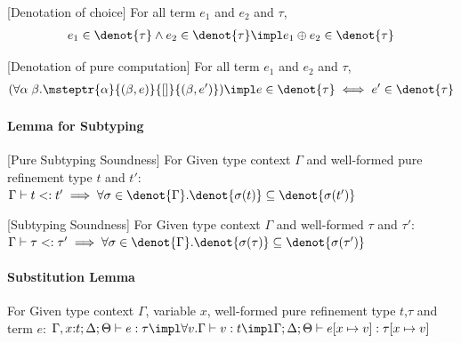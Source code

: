\begin{lemma}\label{lemma:choice-denot}[Denotation of choice] For all term $e_1$ and $e_2$ and \PAT $\tau$,
{\small\begin{align*}
    e_1 \in \denot{\tau} \land e_2 \in \denot{\tau} \impl e_1 \oplus e_2 \in \denot{\tau}
\end{align*}}
\end{lemma}

\begin{lemma}\label{lemma:pure-denot}[Denotation of pure computation] For all term $e_1$ and $e_2$ and \PAT $\tau$,
{\small\begin{align*}
    (\forall \alpha\;\beta. \msteptr{\alpha}{(\beta, e)}{[]}{(\beta, e')}) \impl
   e\in \denot{\tau} \iff e' \in \denot{\tau}
\end{align*}}
\end{lemma}


\paragraph{Lemma for Subtyping}

\begin{lemma}\label{lemma:pure-subtyping}[Pure Subtyping Soundness] For Given type context $\Gamma$ and well-formed pure refinement type $t$ and $t'$:
  $\Gamma \vdash t <: t' \implies \forall \sigma \in \denot{\Gamma}. \denot{\sigma(t)} \subseteq \denot{\sigma(t')}$
\end{lemma}

\begin{lemma}\label{lemma:subtyping}[Subtyping Soundness] For Given type context $\Gamma$ and well-formed \PAT $\tau$ and $\tau'$:
  $\Gamma \vdash \tau <: \tau' \implies \forall \sigma \in \denot{\Gamma}. \denot{\sigma(\tau)} \subseteq \denot{\sigma(\tau')}$
\end{lemma}

\paragraph{Substitution Lemma}

\begin{lemma}\label{lemma:subt} For Given type context $\Gamma$, variable $x$, well-formed pure refinement type $t$,\PAT $\tau$ and term $e$:
  $\Gamma, x{:}t;\Delta;\Theta \vdash e : \tau \impl \forall v. \Gamma \vdash v : t \impl \Gamma;\Delta;\Theta \vdash e[x\mapsto v] : \tau[x\mapsto v]$
\end{lemma}

